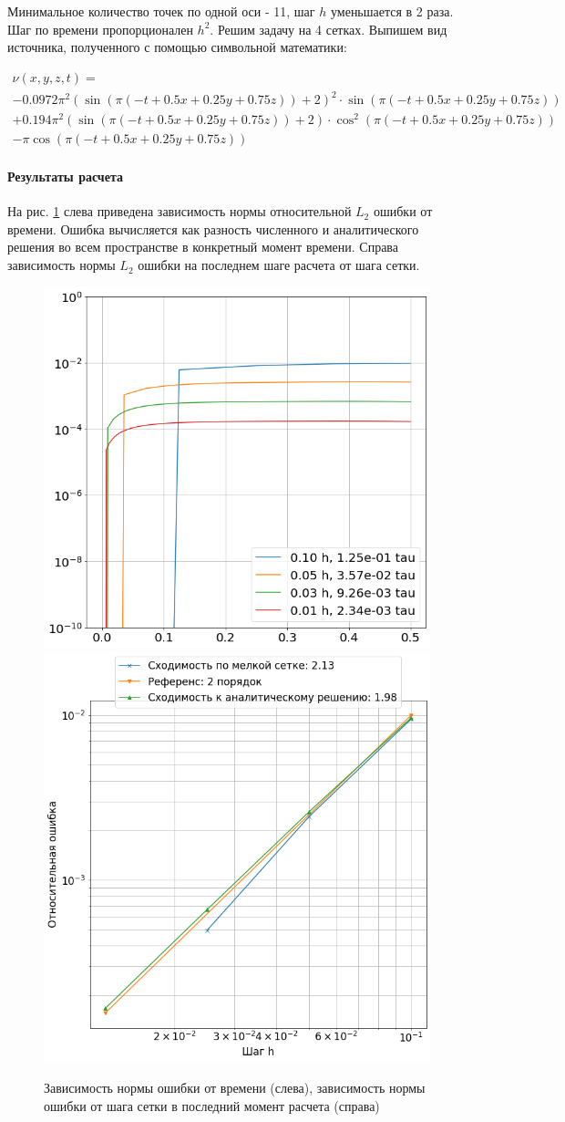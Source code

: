 Минимальное количество точек по одной оси - 11, шаг $h$ уменьшается в 2 раза. Шаг по времени пропорционален $h^2$. Решим задачу на 4 сетках.
Выпишем вид источника, полученного с помощью символьной математики:

\begin{multline}
    \nu(x, y, z, t) = \\ - 0.0972 \pi^{2} \left(\sin{\left(\pi \left(- t + 0.5 x + 0.25 y + 0.75 z\right) \right)} + 2\right)^{2} \cdot \sin{\left(\pi \left(- t + 0.5 x + 0.25 y + 0.75 z\right) \right)} \\ + 0.194 \pi^{2} \left(\sin{\left(\pi \left(- t + 0.5 x + 0.25 y + 0.75 z\right) \right)} + 2\right) \cdot \cos^{2}{\left(\pi \left(- t + 0.5 x + 0.25 y + 0.75 z\right) \right)} \\ - \pi \cos{\left(\pi \left(- t + 0.5 x + 0.25 y + 0.75 z\right) \right)}
\end{multline}

\paragraph{Результаты расчета}
На рис. \ref{fig:heat3d_time_error} слева приведена зависимость нормы относительной $L_2$ ошибки от времени. Ошибка вычисляется как разность численного и аналитического решения во всем пространстве в конкретный момент времени. Справа зависимость нормы $L_2$ ошибки на последнем шаге расчета от шага сетки.

\begin{figure}[H]
\centering
\includegraphics[width=.5\textwidth]{heat3d/time-error.png}\hfill
\includegraphics[width=.5\textwidth]{heat3d/convergence.png}
\caption{Зависимость нормы ошибки от времени (слева), зависимость нормы ошибки от шага сетки в последний момент расчета (справа)}
\label{fig:heat3d_time_error}
\end{figure}


